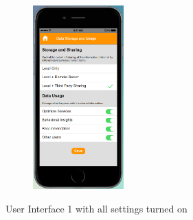 \begin{appendices}
\begin{figure}
\begin{subfigure}[t]{0.24\textwidth}
	\end{subfigure}%
	~
	\begin{subfigure}[t]{0.24\textwidth}
		\centering
		\includegraphics[height=2.8in]{figures/ui1allOn4.png}
	\end{subfigure}%
	\caption{User Interface 1 with all settings turned on}
	\label{fig:ui1AllOn}
\end{figure}


\end{appendices}
